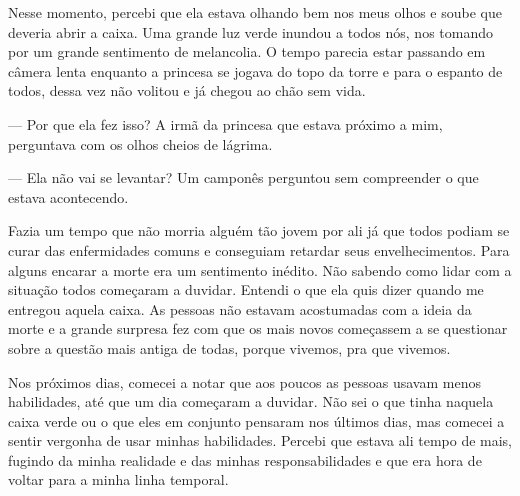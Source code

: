 Nesse momento, percebi que ela estava olhando bem nos meus olhos e soube que deveria abrir a caixa. Uma grande luz verde inundou a todos nós, nos tomando por um grande sentimento de melancolia. O tempo parecia estar passando em câmera lenta enquanto a princesa se jogava do topo da torre e para o espanto de todos, dessa vez não volitou e já chegou ao chão sem vida.

— Por que ela fez isso? A irmã da princesa que estava próximo a mim, perguntava com os olhos cheios de lágrima.

— Ela não vai se levantar? Um camponês perguntou sem compreender o que estava acontecendo.

Fazia um tempo que não morria alguém tão jovem por ali já que todos podiam se curar das enfermidades comuns e conseguiam retardar seus envelhecimentos. Para alguns encarar a morte era um sentimento inédito. Não sabendo como lidar com a situação todos começaram a duvidar. Entendi o que ela quis dizer quando me entregou aquela caixa.
As pessoas não estavam acostumadas com a ideia da morte e a grande surpresa fez com que os mais novos começassem a se questionar sobre a questão mais antiga de todas, porque vivemos, pra que vivemos.

Nos próximos dias, comecei a notar que aos poucos as pessoas usavam menos habilidades, até que um dia começaram a duvidar. Não sei o que tinha naquela caixa verde ou o que eles em conjunto pensaram nos últimos dias, mas comecei a sentir vergonha de usar minhas habilidades. Percebi que estava ali tempo de mais, fugindo da minha realidade e das minhas responsabilidades e que era hora de voltar para a minha linha temporal.
